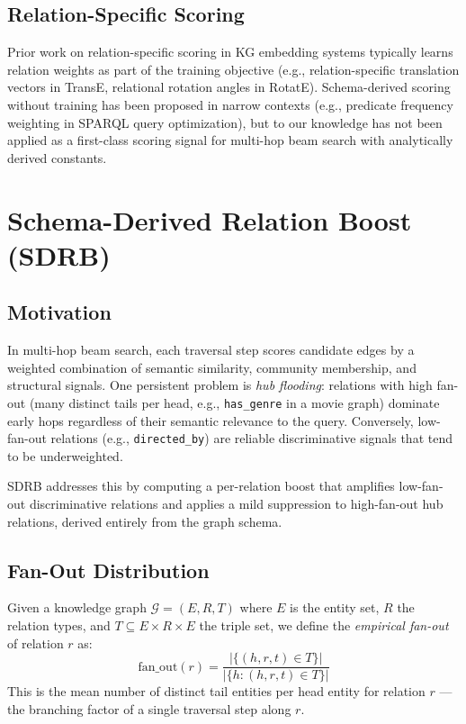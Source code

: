 \documentclass[11pt,a4paper]{article}
\begin{document}
\subsection{Relation-Specific Scoring}

Prior work on relation-specific scoring in KG embedding systems typically
learns relation weights as part of the training objective
(e.g., relation-specific translation vectors in TransE, relational
rotation angles in RotatE).
Schema-derived scoring without training has been proposed in narrow contexts
(e.g., predicate frequency weighting in SPARQL query optimization), but to
our knowledge has not been applied as a first-class scoring signal for
multi-hop beam search with analytically derived constants.

\section{Schema-Derived Relation Boost (SDRB)}
\label{sec:sdrb}

\subsection{Motivation}

In multi-hop beam search, each traversal step scores candidate edges by a
weighted combination of semantic similarity, community membership, and
structural signals.
One persistent problem is \emph{hub flooding}: relations with high fan-out
(many distinct tails per head, e.g., \texttt{has\_genre} in a movie graph)
dominate early hops regardless of their semantic relevance to the query.
Conversely, low-fan-out relations (e.g., \texttt{directed\_by}) are
reliable discriminative signals that tend to be underweighted.

SDRB addresses this by computing a per-relation boost that amplifies
low-fan-out discriminative relations and applies a mild suppression to
high-fan-out hub relations, derived entirely from the graph schema.

\subsection{Fan-Out Distribution}

Given a knowledge graph $\mathcal{G} = (E, R, T)$ where $E$ is the
entity set, $R$ the relation types, and $T \subseteq E \times R \times E$
the triple set, we define the \emph{empirical fan-out} of relation $r$ as:
\begin{equation}
  \text{fan\_out}(r) = \frac{|\{(h, r, t) \in T\}|}{|\{h : (h, r, t) \in T\}|}
  \label{eq:fanout}
\end{equation}
This is the mean number of distinct tail entities per head entity for
relation $r$ --- the branching factor of a single traversal step along $r$.
\end{document}

